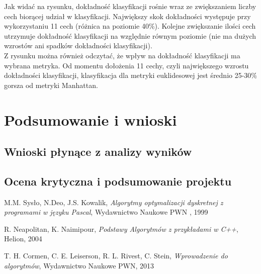 \documentclass[11pt, a4paper, titlepage]{report}
\begin{document}
Jak widać na rysunku, dokładność klasyfikacji rośnie wraz ze zwiększaniem liczby cech biorącej udział w klasyfikacji. Największy skok dokładności występuje przy wykorzystaniu 11 cech (różnica na poziomie 40\%). Kolejne zwiększanie ilości cech utrzymuje dokładność klasyfikacji na względnie równym poziomie (nie ma dużych wzrostów ani spadków dokładności klasyfikacji).\\
Z rysunku można również odczytać, że wpływ na dokładność klasyfikacji ma wybrana metryka. Od momentu dołożenia 11 cechy, czyli największego wzrostu dokładności klasyfikacji, klasyfikacja dla metryki euklidesowej jest średnio 25-30\% gorsza od metryki Manhattan.

\chapter{Podsumowanie i wnioski}
\label{chap:Podsumowanie i wnioski}
\section{Wnioski płynące z analizy wyników}
\section{Ocena krytyczna i podsumowanie projektu}

\begin{thebibliography}{}
M.M. Sysło, N.Deo, J.S. Kowalik, \textit{Algorytmy optymalizacji dyskretnej z programami w języku Pascal}, Wydawnictwo Naukowe PWN , 1999

R. Neapolitan, K. Naimipour, \textit{Podstawy Algorytmów z przykładami w C++}, Helion, 2004

T. H. Cormen, C. E. Leiserson, R. L. Rivest, C. Stein, \textit{Wprowadzenie do algorytmów}, Wydawnictwo Naukowe PWN, 2013

\end{thebibliography}
\end{document}
